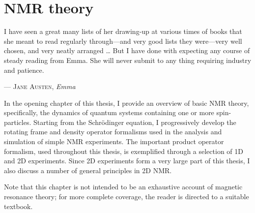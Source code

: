 \chapter{NMR theory}
\label{chpt:theory}


\epigraph{\singlespacing%
I have seen a great many lists of her drawing-up at various times of books that she meant to read regularly through—and very good lists they were---very well chosen, and very neatly arranged \ldots{} But I have done with expecting any course of steady reading from Emma. She will never submit to any thing requiring industry and patience.
}{--- \textsc{Jane Austen}, \textit{Emma}}

In the opening chapter of this thesis, I provide an overview of basic NMR theory, specifically, the dynamics of quantum systems containing one or more spin-\half{} particles.
Starting from the Schr\"odinger equation, I progressively develop the rotating frame and density operator formalisms used in the analysis and simulation of simple NMR experiments.
The important product operator formalism, used throughout this thesis, is exemplified through a selection of 1D and 2D experiments.
Since 2D experiments form a very large part of this thesis, I also discuss a number of general principles in 2D NMR.

Note that this chapter is not intended to be an exhaustive account of magnetic resonance theory; for more complete coverage, the reader is directed to a suitable textbook.

\clearpage






\printbibliography[heading=subbibnumbered]{}
